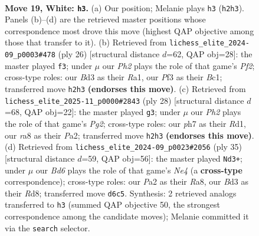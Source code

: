 \documentclass[11pt]{article}
\begin{document}
\clearpage

\begin{figure}[p]\centering
\begin{subfigure}{0.46\textwidth}\centering
\resizebox{\linewidth}{!}{%
\newchessgame
\chessboard[
  setfen={r1b1kbnr/p5pp/2pB4/5p2/2N5/3B1P2/PPP3PP/R2R2K1 w - - 1 19},
  showmover=false,
  pgfstyle=straightmove, color=movearrow, markmove={h2-h3}
]}
\caption{}
\end{subfigure}\hfill
\begin{subfigure}{0.46\textwidth}\centering
\resizebox{\linewidth}{!}{%
\newchessgame
\chessboard[
  setfen={rn1k3r/pp3pp1/5n1p/3b4/4N3/2P3P1/P4PBP/R1B1K2R w KQ - 1 14},
  showmover=false,
  pgfstyle=straightmove, color=movearrow, markmove={f2-f3}
]}
\caption{}
\end{subfigure}
\\[4pt]
\begin{subfigure}{0.46\textwidth}\centering
\resizebox{\linewidth}{!}{%
\newchessgame
\chessboard[
  setfen={r3kb1r/5ppp/b1p1p3/p2n4/8/N7/PPPB1PPP/1R1R1BK1 w kq - 4 15},
  showmover=false,
  pgfstyle=straightmove, color=movearrow, markmove={g2-g3}
]}
\caption{}
\end{subfigure}\hfill
\begin{subfigure}{0.46\textwidth}\centering
\resizebox{\linewidth}{!}{%
\newchessgame
\chessboard[
  setfen={r2r2k1/pp3pbp/4p1p1/4n3/6b1/2P3B1/PP1NB1PP/R3K2R b KQ - 1 18},
  showmover=false,
  pgfstyle=straightmove, color=movearrow, markmove={e5-d3}
]}
\caption{}
\end{subfigure}
\caption{\textbf{Move 19, White: \texttt{h3}.} (a) Our position; Melanie plays \texttt{h3} (\texttt{h2h3}). Panels (b)--(d) are the retrieved master positions whose correspondence most drove this move (highest QAP objective among those that transfer to it). (b) Retrieved from \texttt{lichess\_elite\_2024-09\_p0003\#478} (ply 26) [structural distance $d$=62, QAP obj=28]: the master played \texttt{f3}; under $\mu$ our \emph{Ph2} plays the role of that game's \emph{Pf2}; cross-type roles: our \emph{B}d3 as their \emph{R}a1, our \emph{P}f3 as their \emph{B}c1; transferred move \texttt{h2h3} \textbf{(endorses this move)}. (c) Retrieved from \texttt{lichess\_elite\_2025-11\_p0000\#2843} (ply 28) [structural distance $d$=68, QAP obj=22]: the master played \texttt{g3}; under $\mu$ our \emph{Ph2} plays the role of that game's \emph{Pg2}; cross-type roles: our \emph{p}h7 as their \emph{R}d1, our \emph{r}a8 as their \emph{P}a2; transferred move \texttt{h2h3} \textbf{(endorses this move)}. (d) Retrieved from \texttt{lichess\_elite\_2024-09\_p0023\#2056} (ply 35) [structural distance $d$=59, QAP obj=56]: the master played \texttt{Nd3+}; under $\mu$ our \emph{Bd6} plays the role of that game's \emph{Ne4} (a \textbf{cross-type} correspondence); cross-type roles: our \emph{P}a2 as their \emph{R}a8, our \emph{B}d3 as their \emph{R}d8; transferred move \texttt{d6c5}. Synthesis: 2 retrieved analogs transferred to \texttt{h3} (summed QAP objective 50, the strongest correspondence among the candidate moves); Melanie committed it via the \texttt{search} selector.}
\label{fig:thought-m36}
\end{figure}
\end{document}
